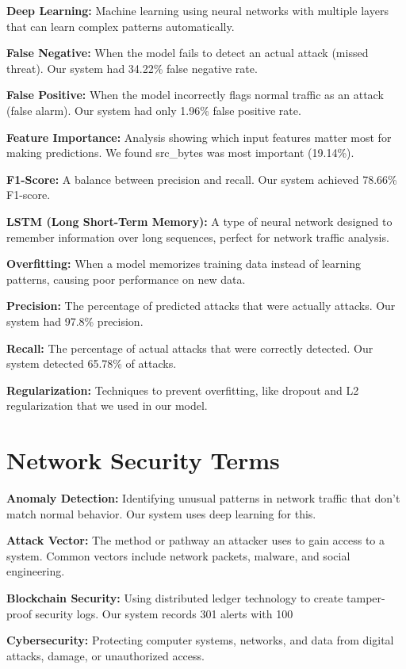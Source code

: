 \documentclass[12pt,a4paper]{report}
\begin{document}
\textbf{Deep Learning:} Machine learning using neural networks with multiple layers that can learn complex patterns automatically.

\textbf{False Negative:} When the model fails to detect an actual attack (missed threat). Our system had 34.22\% false negative rate.

\textbf{False Positive:} When the model incorrectly flags normal traffic as an attack (false alarm). Our system had only 1.96\% false positive rate.

\textbf{Feature Importance:} Analysis showing which input features matter most for making predictions. We found src\_bytes was most important (19.14\%).

\textbf{F1-Score:} A balance between precision and recall. Our system achieved 78.66\% F1-score.

\textbf{LSTM (Long Short-Term Memory):} A type of neural network designed to remember information over long sequences, perfect for network traffic analysis.

\textbf{Overfitting:} When a model memorizes training data instead of learning patterns, causing poor performance on new data.

\textbf{Precision:} The percentage of predicted attacks that were actually attacks. Our system had 97.8\% precision.

\textbf{Recall:} The percentage of actual attacks that were correctly detected. Our system detected 65.78\% of attacks.

\textbf{Regularization:} Techniques to prevent overfitting, like dropout and L2 regularization that we used in our model.

\section{Network Security Terms}

\textbf{Anomaly Detection:} Identifying unusual patterns in network traffic that don't match normal behavior. Our system uses deep learning for this.

\textbf{Attack Vector:} The method or pathway an attacker uses to gain access to a system. Common vectors include network packets, malware, and social engineering.

\textbf{Blockchain Security:} Using distributed ledger technology to create tamper-proof security logs. Our system records 301 alerts with 100%

\textbf{Cybersecurity:} Protecting computer systems, networks, and data from digital attacks, damage, or unauthorized access.
\end{document}
